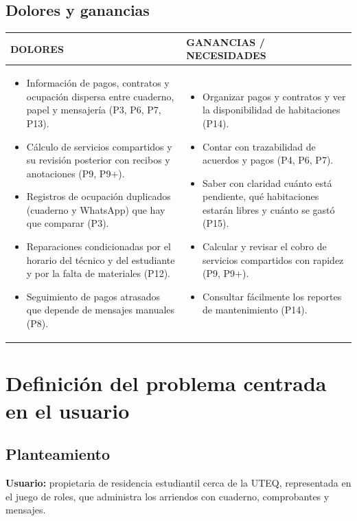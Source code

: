 \documentclass[12pt,a4paper]{article}
\renewcommand{\arraystretch}{1.12}
\begin{document}
\subsection{Dolores y ganancias}
{\footnotesize
\renewcommand{\arraystretch}{1.1}
\begin{tabularx}{\linewidth}{|X|X|}
\hline
\rowcolor{fondo}\textbf{\color{azul}DOLORES} & \textbf{\color{azul}GANANCIAS / NECESIDADES} \\ \hline
\begin{itemize}[leftmargin=*,itemsep=1pt,topsep=2pt,label=--]
\item {Información de pagos, contratos y ocupación dispersa entre cuaderno, papel y mensajería (P3, P6, P7, P13).}
\item {Cálculo de servicios compartidos y su revisión posterior con recibos y anotaciones (P9, P9+).}
\item {Registros de ocupación duplicados (cuaderno y WhatsApp) que hay que comparar (P3).}
\item {Reparaciones condicionadas por el horario del técnico y del estudiante y por la falta de materiales (P12).}
\item {Seguimiento de pagos atrasados que depende de mensajes manuales (P8).}
\end{itemize}
&
\begin{itemize}[leftmargin=*,itemsep=1pt,topsep=2pt,label=--]
\item {Organizar pagos y contratos y ver la disponibilidad de habitaciones (P14).}
\item {Contar con trazabilidad de acuerdos y pagos (P4, P6, P7).}
\item {Saber con claridad cuánto está pendiente, qué habitaciones estarán libres y cuánto se gastó (P15).}
\item {Calcular y revisar el cobro de servicios compartidos con rapidez (P9, P9+).}
\item {Consultar fácilmente los reportes de mantenimiento (P14).}
\end{itemize} \\ \hline
\end{tabularx}
}


\section{Definición del problema centrada en el usuario}
\subsection{Planteamiento}
\textbf{Usuario:} propietaria de residencia estudiantil cerca de la UTEQ, representada en el juego de roles, que administra los arriendos con cuaderno, comprobantes y mensajes.
\end{document}
